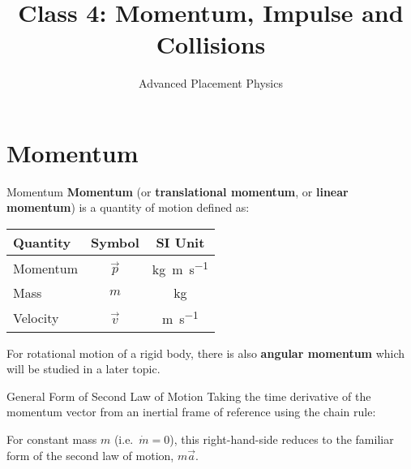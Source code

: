 \documentclass[12pt,compress,aspectratio=169]{beamer}
\title{Class 4: Momentum, Impulse and Collisions}
\subtitle{Advanced Placement Physics}
\begin{document}
\begin{frame}
  \maketitle
\end{frame}



\section{Momentum}

\begin{frame}{Momentum}
  \textbf{Momentum} (or \textbf{translational momentum}, or \textbf{linear
    momentum}) is a quantity of motion defined as:

  \begin{center}
    \begin{tabular}{l|c|c}
      \rowcolor{pink}
      \textbf{Quantity}   & \textbf{Symbol} & \textbf{SI Unit} \\ \hline
      Momentum  & $\vec p$ & \si{\kilo\gram\metre\per\second} \\
      Mass      & $m$     & \si{\kilo\gram} \\
      Velocity  & $\vec v$ & \si{\metre\per\second}
    \end{tabular}
  \end{center}
  For rotational motion of a rigid body, there is also \textbf{angular momentum}
  which will be studied in a later topic.
\end{frame}



\begin{frame}{General Form of Second Law of Motion}
  Taking the time derivative of the momentum vector from an inertial frame of
  reference using the chain rule:


  For constant mass $m$ (i.e.\ $\dot m=0$), this right-hand-side reduces to the
  familiar form of the second law of motion, $m\vec a$.
\end{frame}
\end{document}
